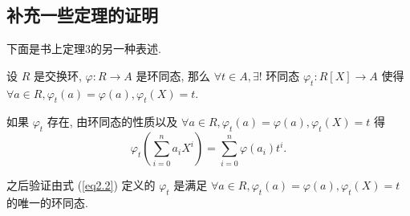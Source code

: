 \documentclass[UTF8]{ctexart}
\begin{document}
\subsection{补充一些定理的证明}
下面是书上定理3的另一种表述.
\begin{theorem}[书上的定理3]\label{t2.1}
    设 $R$ 是交换环, $\varphi:R\to A$ 是环同态, 那么 $\forall t\in A,\exists!$ 环同态 $\varphi_t:R[X]\to A$ 使得 $\forall a\in R,\varphi_t(a)=\varphi(a),\varphi_t(X)=t$.
\end{theorem}
\begin{thought}
    如果 $\varphi_t$ 存在, 由环同态的性质以及 $\forall a\in R,\varphi_t(a)=\varphi(a),\varphi_t(X)=t$ 得
    \begin{equation}\label{eq2.2}
        \varphi_t\left(\sum\limits_{i=0}^{n}a_iX^i\right)=\sum\limits_{i=0}^{n}\varphi(a_i)t^i.
    \end{equation}

    之后验证由式 (\ref{eq2.2}) 定义的 $\varphi_t$ 是满足 $\forall a\in R,\varphi_t(a)=\varphi(a),\varphi_t(X)=t$ 的唯一的环同态.
\end{thought}
\end{document}
